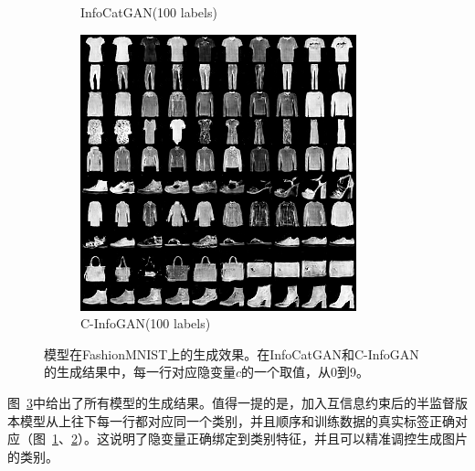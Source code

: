 \begin{figure}[htbp]
\begin{subfigure}[b]{\trif\textwidth}
    \caption{InfoCatGAN(100 labels)}
    \label{ffig:ss-icg}
  \end{subfigure}
  \begin{subfigure}[b]{\trif\textwidth}
    \includegraphics[width=\textwidth]{Img/fa-ig-100labels.png}
    \caption{C-InfoGAN(100 labels)}
    \label{ffig:ss-ig}
  \end{subfigure}

  \caption{模型在FashionMNIST上的生成效果。在InfoCatGAN和C-InfoGAN的生成结果中，每一行对应隐变量$c$的一个取值，从0到9。}
  \label{fig:fashion}
\end{figure}

图~\ref{fig:fashion}中给出了所有模型的生成结果。值得一提的是，加入互信息约束后的半监督版本模型从上往下每一行都对应同一个类别，并且顺序和训练数据的真实标签正确对应（图~\ref{ffig:ss-icg}、\ref{ffig:ss-ig}）。这说明了隐变量正确绑定到类别特征，并且可以精准调控生成图片的类别。

